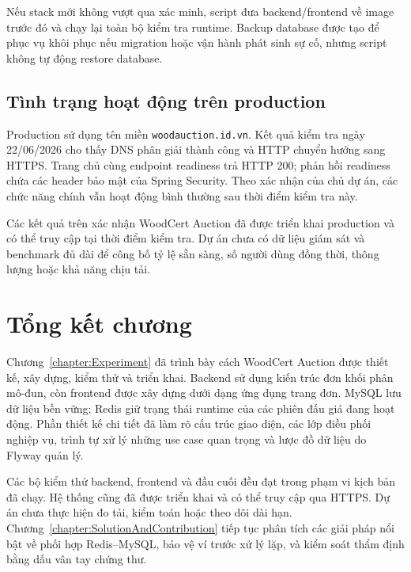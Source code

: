 \documentclass[../DoAn.tex]{subfiles}
\begin{document}
Nếu stack mới không vượt qua xác minh, script đưa backend/frontend về image trước đó và chạy lại toàn bộ kiểm tra runtime. Backup database được tạo để phục vụ khôi phục nếu migration hoặc vận hành phát sinh sự cố, nhưng script không tự động restore database.

\FloatBarrier
\subsection{Tình trạng hoạt động trên production}

Production sử dụng tên miền \texttt{woodauction.id.vn}. Kết quả kiểm tra ngày 22/06/2026 cho thấy DNS phân giải thành công và HTTP chuyển hướng sang HTTPS. Trang chủ cùng endpoint readiness trả HTTP 200; phản hồi readiness chứa các header bảo mật của Spring Security. Theo xác nhận của chủ dự án, các chức năng chính vẫn hoạt động bình thường sau thời điểm kiểm tra này.

Các kết quả trên xác nhận WoodCert Auction đã được triển khai production và có thể truy cập tại thời điểm kiểm tra. Dự án chưa có dữ liệu giám sát và benchmark đủ dài để công bố tỷ lệ sẵn sàng, số người dùng đồng thời, thông lượng hoặc khả năng chịu tải.

\FloatBarrier
\section{Tổng kết chương}

Chương~\ref{chapter:Experiment} đã trình bày cách WoodCert Auction được thiết kế, xây dựng, kiểm thử và triển khai. Backend sử dụng kiến trúc đơn khối phân mô-đun, còn frontend được xây dựng dưới dạng ứng dụng trang đơn. MySQL lưu dữ liệu bền vững; Redis giữ trạng thái runtime của các phiên đấu giá đang hoạt động. Phần thiết kế chi tiết đã làm rõ cấu trúc giao diện, các lớp điều phối nghiệp vụ, trình tự xử lý những use case quan trọng và lược đồ dữ liệu do Flyway quản lý.

Các bộ kiểm thử backend, frontend và đầu cuối đều đạt trong phạm vi kịch bản đã chạy. Hệ thống cũng đã được triển khai và có thể truy cập qua HTTPS. Dự án chưa thực hiện đo tải, kiểm toán hoặc theo dõi dài hạn. Chương~\ref{chapter:SolutionAndContribution} tiếp tục phân tích các giải pháp nổi bật về phối hợp Redis--MySQL, bảo vệ ví trước xử lý lặp, và kiểm soát thẩm định bằng dấu vân tay chứng thư.

\flushbottom
\end{document}
